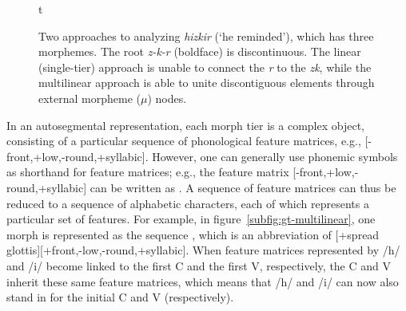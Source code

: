 \begin{figure}{t}
{	}
\caption{Two approaches to analyzing \textit{hizkir} (`he reminded'), which has three morphemes. 
The root \textit{z-k-r} (boldface) is discontinuous. The linear (single-tier) approach is unable to connect the \textit{r} to the \textit{zk}, while the multilinear approach is able to unite discontiguous elements through external morpheme ($\mu$) nodes.}
\label{fig:approaches}
\end{figure}

In an autosegmental representation, each morph tier is a complex object, consisting of a particular sequence of phonological feature matrices, e.g., [-front,+low,-round,+syllabic]. However, one can generally use phonemic symbols as shorthand for
feature matrices; e.g., the feature matrix [-front,+low,-round,+syllabic] can be written as . A sequence of feature matrices can thus be reduced to a sequence of alphabetic characters, each of which represents a particular set of features. For example, in figure~\ref{subfig:gt-multilinear}, one morph is represented as the sequence , which is an abbreviation of \textipa{/}[+spread glottis][+front,-low,-round,+syllabic]\textipa{/}.
When feature matrices represented by /h/ and /i/ become linked to the first C and the first V, respectively, the C and V inherit these same feature matrices, which means that /h/ and /i/ can now also stand in for the initial C and V (respectively). 

